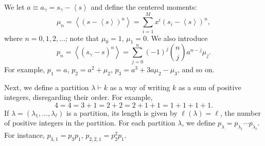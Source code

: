 \documentclass[9pt,twocolumn,twoside]{gsajnl}
\newcommand{\avg}[1]{\left\langle #1\right\rangle}
\begin{document}
We let
$a \equiv a_\gamma=s_\gamma - \avg{s}$
and define the centered moments:
\begin{equation}
\mu_n = \avg{(s-\avg{s})^n}
= \sum_{i=1}^M x^i (s_i-\avg{s})^n,
\label{eq:mu-def}
\end{equation}
where $n = 0, 1, 2, \dots$; note that $\mu_0=1$, $\mu_1=0$.
We also introduce
\begin{equation}
p_n = \avg{(s_\gamma-s)^n} = \sum_{j=0}^n (-1)^j \binom{n}{j} a^{n-j} \mu_j.
\label{eq:p-def}
\end{equation}
For example, $p_1 = a$, $p_2 = a^2+\mu_2$, $p_3 = a^3+3a\mu_2-\mu_3$, and so on.


Next, we define a partition $\lambda \vdash k$ as a way of writing $k$ as a sum of positive integers, disregarding their order. For example,
\begin{equation*}
4=4=3+1=2+2=2+1+1=1+1+1+1.
\end{equation*}
If $\lambda=(\lambda_1,\ldots,\lambda_\ell)$ is a partition, its length is given by $\ell(\lambda) = \ell$, the number of positive integers in the partition. 
For each partition $\lambda$, we define $p_\lambda=p_{\lambda_1} \cdots p_{\lambda_\ell}$.
For instance, $p_{3,1}=p_3 p_1$, $p_{2,2,1}=p_2^2 p_1$.
\end{document}
